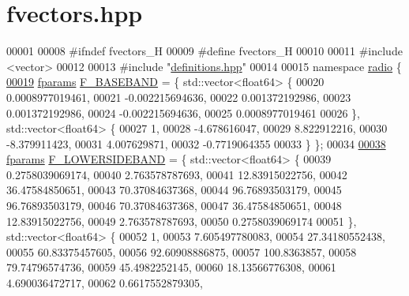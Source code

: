 \hypertarget{fvectors_8hpp_source}{\section{fvectors.\+hpp}
\label{fvectors_8hpp_source}
}

\begin{DoxyCode}
00001 
00008 \textcolor{preprocessor}{#ifndef fvectors\_H}
00009 \textcolor{preprocessor}{#define fvectors\_H}
00010 
00011 \textcolor{preprocessor}{#include <vector>}
00012 
00013 \textcolor{preprocessor}{#include "\hyperlink{definitions_8hpp}{definitions.hpp}"}
00014 
00015 \textcolor{keyword}{namespace }\hyperlink{namespaceradio}{radio} \{
\hypertarget{fvectors_8hpp_source_l00019}{}\hyperlink{namespaceradio_a9bd902e9216499953a5906de73dc1796}{00019}     \hyperlink{definitions_8hpp_a7615684c2af56be5f302c5b367d71f6b}{fparams} \hyperlink{namespaceradio_a9bd902e9216499953a5906de73dc1796}{F\_BASEBAND} = \{ std::vector<float64> \{
00020         0.0008977019461,
00021             -0.002215694636,
00022             0.001372192986,
00023             0.001372192986,
00024             -0.002215694636,
00025             0.0008977019461 
00026     \}, std::vector<float64> \{
00027         1,
00028             -4.678616047,
00029             8.822912216,
00030             -8.379911423,
00031             4.007629871,
00032             -0.7719064355
00033     \} \};
00034 
\hypertarget{fvectors_8hpp_source_l00038}{}\hyperlink{namespaceradio_a0ffd57d5a11ff70a1f55dbdc8ebe098d}{00038}     \hyperlink{definitions_8hpp_a7615684c2af56be5f302c5b367d71f6b}{fparams} \hyperlink{namespaceradio_a0ffd57d5a11ff70a1f55dbdc8ebe098d}{F\_LOWERSIDEBAND} = \{ std::vector<float64> \{
00039         0.2758039069174,   
00040             2.763578787693,   
00041             12.83915022756,   
00042             36.47584850651,
00043             70.37084637368,   
00044             96.76893503179,   
00045             96.76893503179,   
00046             70.37084637368,
00047             36.47584850651,   
00048             12.83915022756,   
00049             2.763578787693,  
00050             0.2758039069174   
00051     \}, std::vector<float64> \{
00052         1,
00053             7.605497780083,   
00054             27.34180552438,   
00055             60.83375457605,
00056             92.60908886875,       
00057             100.8363857,    
00058             79.74796574736,     
00059             45.4982252145,
00060             18.13566776308,    
00061             4.690036472717,   
00062             0.6617552879305,   

\end{DoxyCode}

